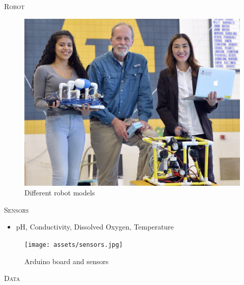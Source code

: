 \documentclass[final,t]{beamer}
\begin{document}
\begin{frame}{}
\begin{columns}[t]
\begin{column}{.5\linewidth}
                \begin{block}{\textsc{Robot}}
                    \vspace*{6mm}
                    \begin{figure}
                        \includegraphics[scale = 0.5]{assets/group_pic.jpg}
                        \caption{Different robot models}
                    \end{figure}
                \end{block}

                \begin{block}{\textsc{Sensors}}
                    \vspace*{6mm}
                    \begin{itemize}
                        \item pH, Conductivity, Dissolved Oxygen, Temperature
                    \end{itemize}
                    \begin{figure}
                        \centering
                        \texttt{[image: assets/sensors.jpg]}
                        \caption{Arduino board and sensors}
                    \end{figure}
                \end{block}

                \begin{block}{\textsc{Data}}
                    \vspace*{6mm}
                \end{block}
            \end{column}



\end{columns}
\end{frame}
\end{document}
